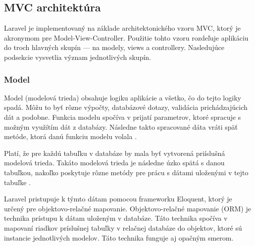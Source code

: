 \subsection{MVC architektúra}
Laravel je implementovaný na základe architektonického vzoru MVC, ktorý je akronymom pre Model-View-Controller. Použitie tohto vzoru rozdeľuje aplikáciu do troch hlavných skupín --- na modely, views a controllery. Nasledujúce podsekcie vysvetlia význam jednotlivých skupín.

\subsubsection*{Model}
Model (modelová trieda) obsahuje logiku aplikácie a všetko, čo do tejto logiky spadá. Môžu to byť rôzne výpočty, databázové dotazy, validácia prichádzajúcich dát a podobne. Funkcia modelu spočíva v prijatí parametrov, ktoré spracuje s možným využítím dát z databázy. Následne takto spracované dáta vráti späť metóde, ktorá danú funkciu modelu volala \cite{mvc-architektura}.

Platí, že pre každú tabuľku v databáze by mala byť vytvorená priíslušná modelová trieda. Takáto modelová trieda je následne úzko spätá s danou tabuľkou, nakoľko poskytuje rôzne metódy pre prácu s dátami uloženými v tejto tabuľke \cite{co-je-eloquent}.

Laravel pristupuje k týmto dátam pomocou frameworku Eloquent, ktorý je určený pre objektovo-relačné mapovanie.
Objektovo-relačné mapovanie (ORM) je technika prístupu k dátam uloženým v databáze. Táto technika spočíva v mapovaní riadkov príslušnej tabuľky v relačnej databáze do objektov, ktoré sú instancie jednotlivých modelov. Táto technika funguje aj opačným smerom.

